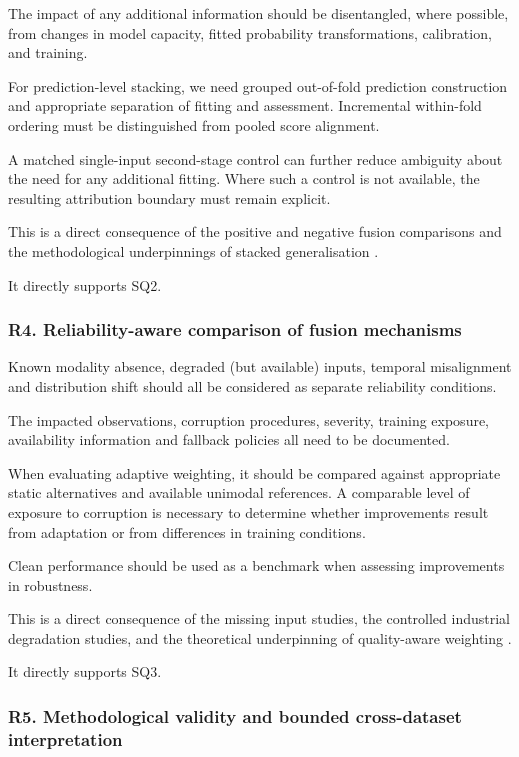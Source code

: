 The impact of any additional information should be disentangled, where possible, from changes in
model capacity, fitted probability transformations, calibration, and training.

For prediction-level stacking, we need grouped out-of-fold prediction construction and appropriate
separation of fitting and assessment. Incremental within-fold ordering must be distinguished from
pooled score alignment.

A matched single-input second-stage control can further reduce ambiguity about the need for any
additional fitting. Where such a control is not available, the resulting attribution boundary must
remain explicit.

This is a direct consequence of the positive and negative fusion comparisons and the methodological
underpinnings of stacked generalisation
\citep{Hua2026Weld,Thoduka2024Handover,Wang2020What,Ting1999Issues}.

It directly supports SQ2.

\subsubsection*{R4. Reliability-aware comparison of fusion mechanisms}

Known modality absence, degraded (but available) inputs, temporal misalignment and distribution
shift should all be considered as separate reliability conditions.

The impacted observations, corruption procedures, severity, training exposure, availability
information and fallback policies all need to be documented.

When evaluating adaptive weighting, it should be compared against appropriate static alternatives
and available unimodal references. A comparable level of exposure to corruption is necessary to
determine whether improvements result from adaptation or from differences in training conditions.

Clean performance should be used as a benchmark when assessing improvements in robustness.

This is a direct consequence of the missing input studies, the controlled industrial degradation
studies, and the theoretical underpinning of quality-aware weighting
\citep{Huo2022Multisensor,Altinses2023Fuzzy,P026,Zhang2023QMF}.

It directly supports SQ3.

\subsubsection*{R5. Methodological validity and bounded cross-dataset interpretation}

